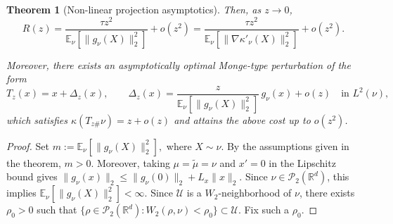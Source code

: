 \documentclass[11pt]{article}
\newtheorem{theorem}{Theorem}
\theoremstyle{definition}
\newcommand{\E}{\mathbb{E}}
\begin{document}
\begin{theorem}[Non-linear projection asymptotics]
Then, as \(z\to0\),
\[
    R(z)
    =
    \frac{\tau z^2}{\E_\nu[\|g_\nu(X)\|_2^2]}
    +o(z^2)
    =
    \frac{\tau z^2}{\E_\nu[\|\nabla\kappa'_\nu(X)\|_2^2]}
    +o(z^2).
\]

Moreover, there exists an asymptotically optimal Monge-type perturbation
of the form
\[
    T_z(x)=x+\Delta_z(x),
    \qquad
    \Delta_z(x)
    =
    \frac{z}{\E_\nu[\|g_\nu(X)\|_2^2]}\,g_\nu(x)+o(z)
    \quad\text{in }L^2(\nu),
\]
which satisfies \(\kappa(T_{z\#}\nu)=z+o(z)\) and attains the above
cost up to \(o(z^2)\).
\end{theorem}

\begin{proof}
{Set $m:=\E_\nu\!\left[\|g_\nu(X)\|_2^2\right],$ where $X\sim \nu.$
By the assumptions given in the theorem, \(m>0\). Moreover, taking
\(\mu=\tilde\mu=\nu\) and \(x'=0\) in the Lipschitz bound gives $\|g_\nu(x)\|_2\le \|g_\nu(0)\|_2 + L_x \|x\|_2$. 
Since \(\nu\in \mathcal P_2(\mathbb R^d)\), this implies
\(\E_\nu[\|g_\nu(X)\|_2^2]<\infty\).
Since \(\mathcal U\) is a \(W_2\)-neighborhood of \(\nu\), there exists \(\rho_0>0\) such that $\{\rho\in\mathcal P_2(\mathbb R^d):W_2(\rho,\nu)<\rho_0\}\subset \mathcal U.$
Fix such a \(\rho_0\).}


\end{proof}
\end{document}

